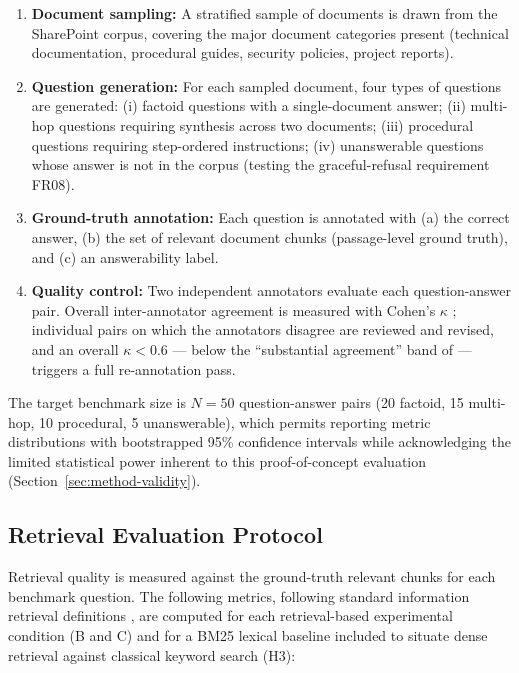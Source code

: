 \begin{enumerate}
  \item \textbf{Document sampling:} A stratified sample of documents is drawn from the SharePoint corpus, covering the major document categories present (technical documentation, procedural guides, security policies, project reports).
  \item \textbf{Question generation:} For each sampled document, four types of questions are generated: (i) factoid questions with a single-document answer; (ii) multi-hop questions requiring synthesis across two documents; (iii) procedural questions requiring step-ordered instructions; (iv) unanswerable questions whose answer is not in the corpus (testing the graceful-refusal requirement FR08).
  \item \textbf{Ground-truth annotation:} Each question is annotated with (a) the correct answer, (b) the set of relevant document chunks (passage-level ground truth), and (c) an answerability label.
  \item \textbf{Quality control:} Two independent annotators evaluate each question-answer pair. Overall inter-annotator agreement is measured with Cohen's $\kappa$ \citep{Cohen1960Kappa}; individual pairs on which the annotators disagree are reviewed and revised, and an overall $\kappa < 0.6$ --- below the ``substantial agreement'' band of \citet{LandisKoch1977} --- triggers a full re-annotation pass.
\end{enumerate}

The target benchmark size is $N = 50$ question-answer pairs (20 factoid, 15 multi-hop, 10 procedural, 5 unanswerable), which permits reporting metric distributions with bootstrapped 95\% confidence intervals \citep{Efron1993Bootstrap} while acknowledging the limited statistical power inherent to this proof-of-concept evaluation (Section~\ref{sec:method-validity}).

\subsection{Retrieval Evaluation Protocol}

Retrieval quality is measured against the ground-truth relevant chunks for each benchmark question. The following metrics, following standard information retrieval definitions \citep{Manning2008IIR}, are computed for each retrieval-based experimental condition (B and C) and for a BM25 lexical baseline \citep{Robertson2009BM25} included to situate dense retrieval against classical keyword search (H3):

